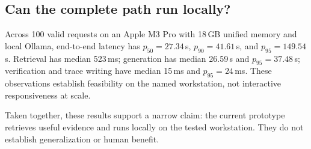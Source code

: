 \subsection{Can the complete path run locally?}
Across 100 valid requests on an Apple M3 Pro with 18\,GB unified memory and local Ollama, end-to-end latency has $p_{50}=27.34$\,s, $p_{90}=41.61$\,s, and $p_{95}=149.54$\,s. Retrieval has median 523\,ms; generation has median 26.59\,s and $p_{95}=37.48$\,s; verification and trace writing have median 15\,ms and $p_{95}=24$\,ms. These observations establish feasibility on the named workstation, not interactive responsiveness at scale.

Taken together, these results support a narrow claim: the current prototype retrieves useful evidence and runs locally on the tested workstation. They do not establish generalization or human benefit.
